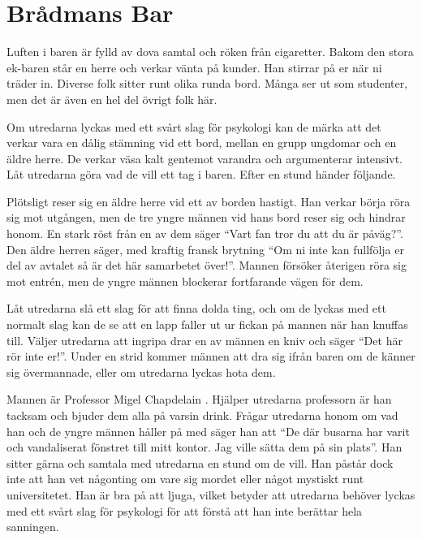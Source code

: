 \section{Brådmans Bar}
\label{loc:BradmansBar}
%
\begin{displayquote}
	Luften i baren är fylld av dova samtal och röken från cigaretter. Bakom den stora ek-baren står en herre och verkar vänta på kunder. Han stirrar på er när ni träder in. Diverse folk sitter runt olika runda bord. Många ser ut som studenter, men det är även en hel del övrigt folk här.
\end{displayquote}
%
Om utredarna lyckas med ett svårt slag för psykologi kan de märka att det verkar vara en dålig stämning vid ett bord, mellan en grupp ungdomar och en äldre herre. De verkar väsa kalt gentemot varandra och argumenterar intensivt. Låt utredarna göra vad de vill ett tag i baren. Efter en stund händer följande.

\begin{displayquote}
	Plötsligt reser sig en äldre herre vid ett av borden hastigt. Han verkar börja röra sig mot utgången, men de tre yngre männen vid hans bord reser sig och hindrar honom. En stark röst från en av dem säger ``Vart fan tror du att du är påväg?''. Den äldre herren säger, med kraftig fransk brytning ``Om ni inte kan fullfölja er del av avtalet så är det här samarbetet över!''. Mannen försöker återigen röra sig mot entrén, men de yngre männen blockerar fortfarande vägen för dem.
\end{displayquote}
%
Låt utredarna slå ett slag för att finna dolda ting, och om de lyckas med ett normalt slag kan de se att en lapp faller ut ur fickan på mannen när han knuffas till.
Väljer utredarna att ingripa drar en av männen en kniv och säger ``Det här rör inte er!''. Under en strid kommer männen att dra sig ifrån baren om de känner sig övermannade, eller om utredarna lyckas hota dem. 

Mannen är Professor Migel Chapdelain \sectiondescribe{\ref{kar:MigelChapdelain}}. Hjälper utredarna professorn är han tacksam och bjuder dem alla på varsin drink. Frågar utredarna honom om vad han och de yngre männen håller på med säger han att ``De där busarna har varit och vandaliserat fönstret till mitt kontor. Jag ville sätta dem på sin plats''. Han sitter gärna och samtala med utredarna en stund om de vill. Han påstår dock inte att han vet någonting om vare sig mordet eller något mystiskt runt universitetet. Han är bra på att ljuga, vilket betyder att utredarna behöver lyckas med ett svårt slag för psykologi för att förstå att han inte berättar hela sanningen.

